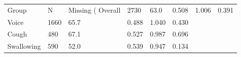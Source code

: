 \begin{tabular}{llllll}
\toprule
Group & N & Missing (%
\midrule
Overall & 2730 & 63.0 & 0.508 & 1.006 & 0.391 \\
Voice & 1660 & 65.7 & 0.488 & 1.040 & 0.430 \\
Cough & 480 & 67.1 & 0.527 & 0.987 & 0.696 \\
Swallowing & 590 & 52.0 & 0.539 & 0.947 & 0.134 \\
\bottomrule
\end{tabular}
